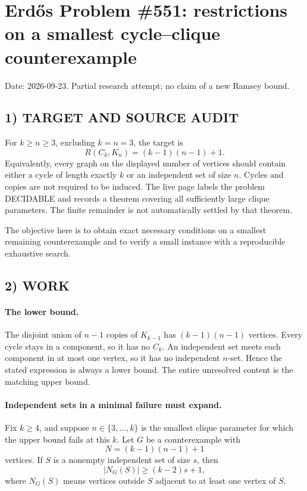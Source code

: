 \section{Erd\H{o}s Problem \#551: restrictions on a smallest cycle--clique counterexample}
\noindent Date: 2026-09-23. Partial research attempt; no claim of a new Ramsey bound.

\subsection{1) TARGET AND SOURCE AUDIT}
For $k\ge n\ge3$, excluding $k=n=3$, the target is
\[
R(C_k,K_n)=(k-1)(n-1)+1.
\]
Equivalently, every graph on the displayed number of vertices should contain either a cycle of length exactly $k$ or an independent set of size $n$. Cycles and copies are not required to be induced. The live page labels the problem DECIDABLE and records a theorem covering all sufficiently large clique parameters. The finite remainder is not automatically settled by that theorem.

The objective here is to obtain exact necessary conditions on a smallest remaining counterexample and to verify a small instance with a reproducible exhaustive search.

\subsection{2) WORK}
\paragraph{The lower bound.}
The disjoint union of $n-1$ copies of $K_{k-1}$ has $(k-1)(n-1)$ vertices. Every cycle stays in a component, so it has no $C_k$. An independent set meets each component in at most one vertex, so it has no independent $n$-set. Hence the stated expression is always a lower bound. The entire unresolved content is the matching upper bound.

\paragraph{Independent sets in a minimal failure must expand.}
Fix $k\ge4$, and suppose $n\in\{3,\ldots,k\}$ is the smallest clique parameter for which the upper bound fails at this $k$. Let $G$ be a counterexample with
\[
N=(k-1)(n-1)+1
\]
vertices. If $S$ is a nonempty independent set of size $s$, then
\[
|N_G(S)|\ge(k-2)s+1,
\tag{1}
\]
where $N_G(S)$ means vertices outside $S$ adjacent to at least one vertex of $S$.

